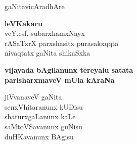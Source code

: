 \thispagestyle{empty}
\begin{center}
{\fontsize{30}{32}\selectfont gaNitavicAradhAre}
\vfill


{\LARGE\bfseries leVKakaru}\\[4pt]
{\large   veY.esf. subarxhamxNayx\\[4pt]
   rASaTxrX parxshasitx purasakxqqta\\[4pt]
   nivaqtatx gaNita shikaSxka}

\vfill

{\Large\bfseries   vijayada bAgilanunx tereyalu satata\\
  parisharxmaveV mUla kAraNa}

\vfill

{\Large
  jiVvanaveV gaNita\\
  senxVhitaranunx kUDisu\\
  shaturxgaLanunx kaLe\\
  saMtoVSavanunx guNisu\\
  duHKavanunx BAgisu}

\end{center}
